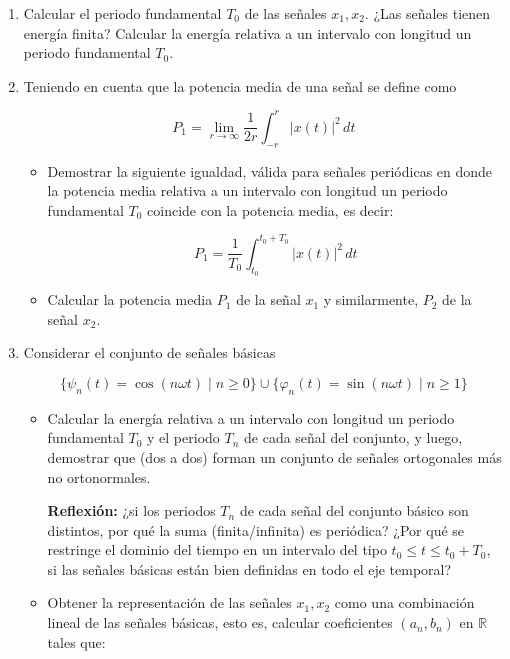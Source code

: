 \documentclass[12pt,a4paper]{report}
\begin{document}
\begin{enumerate}[label=\alph*)]
  \item Calcular el periodo fundamental $T_0$ de las señales $x_1, x_2$. ¿Las señales tienen energía finita? Calcular
    la energía relativa a un intervalo con longitud un periodo fundamental $T_0$.

  \item Teniendo en cuenta que la potencia media de una señal se define como

  $$P_1 = \lim_{r \to \infty} \frac{1}{2r} \int_{-r}^{r} |x(t)|^2 \, dt$$

  \begin{itemize}
    \item Demostrar la siguiente igualdad, válida para señales periódicas en donde la potencia media relativa a un
      intervalo con longitud un periodo fundamental $T_0$ coincide con la potencia media, es decir:

     $$P_1 = \frac{1}{T_0} \int_{t_0}^{t_0 + T_0} |x(t)|^2 \, dt$$

    \item Calcular la potencia media $P_1$ de la señal $x_1$ y similarmente, $P_2$ de la señal $x_2$.

  \end{itemize}

  \item Considerar el conjunto de señales básicas

  $$\{\psi_n(t) = \cos(n\omega t) \mid n \geq 0\} \cup \{\varphi_n(t) = \sin(n\omega t) \mid n \geq 1\}$$

  \begin{itemize}
    \item Calcular la energía relativa a un intervalo con longitud un periodo fundamental $T_0$ y el periodo $T_n$
      de cada señal del conjunto, y luego, demostrar que (dos a dos) forman un conjunto de señales ortogonales más no
      ortonormales.

      \textbf{Reflexión:} ¿si los periodos $T_n$ de cada señal del conjunto básico son distintos, por qué la suma 
      (finita/infinita) es periódica? ¿Por qué se restringe el dominio del tiempo en un intervalo del tipo 
      $t_0 \leq t \leq t_0 + T_0$, si las señales básicas están bien definidas en todo el eje temporal?

   \item Obtener la representación de las señales $x_1, x_2$ como una combinación lineal de las señales básicas, 
     esto es, calcular coeficientes $(a_n, b_n)$ en $\mathbb{R}$ tales que:


\end{itemize}
\end{enumerate}
\end{document}
